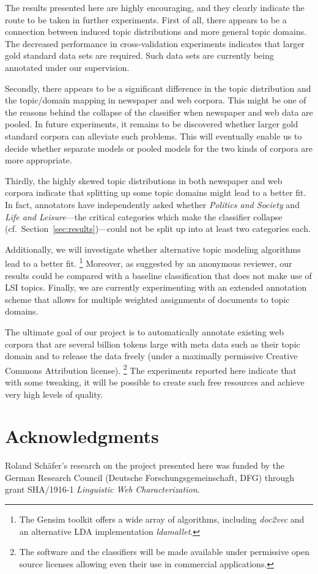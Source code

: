\documentclass[11pt]{article}
\begin{document}
The results presented here are highly encouraging, and they clearly indicate the route to be taken in further experiments.
First of all, there appears to be a connection between induced topic distributions and more general topic domains.
The decreased performance in cross-validation experiments indicates that larger gold standard data sets are required.
Such data sets are currently being annotated under our supervision.

Secondly, there appears to be a significant difference in the topic distribution and the topic\slash domain mapping in newspaper and web corpora.
This might be one of the reasons behind the collapse of the classifier when newspaper and web data are pooled.
In future experiments, it remains to be discovered whether larger gold standard corpora can alleviate such problems.
This will eventually enable us to decide whether separate models or pooled models for the two kinds of corpora are more appropriate.

Thirdly, the highly skewed topic distributions in both newspaper and web corpora indicate that splitting up some topic domains might lead to a better fit.
In fact, annotators have independently asked whether \textit{Politics and Society} and \textit{Life and Leisure}---the critical categories which make the classifier collapse (cf.\ Section~\ref{sec:results})---could not be split up into at least two categories each.

Additionally, we will investigate whether alternative topic modeling algorithms lead to a better fit.%
\footnote{The Gensim toolkit offers a wide array of algorithms, including \textit{doc2vec} and an alternative LDA implementation \textit{ldamallet}.}
Moreover, as suggested by an anonymous reviewer, our results could be compared with a baseline classification that does not make use of LSI topics.
Finally, we are currently experimenting with an extended annotation scheme that allows for multiple weighted assignments of documents to topic domains.

The ultimate goal of our project is to automatically annotate existing web corpora that are several billion tokens large with meta data such as their topic domain and to release the data freely (under a maximally permissive Creative Commons Attribution license).%
\footnote{The software and the classifiers will be made available under permissive open source licenses allowing even their use in commercial applications.}
The experiments reported here indicate that with some tweaking, it will be possible to create such free resources and achieve very high levels of quality.

\section*{Acknowledgments}

Roland Schäfer's research on the project presented here was funded by the German Research Council (Deutsche Forschungsgemeinschaft, DFG) through grant SHA/1916-1 \textit{Linguistic Web Characterization}.



\end{document}
